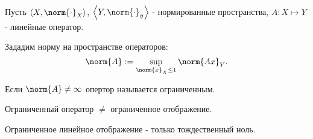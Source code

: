 
\begin{definition} \thmslashn 

    Пусть $\left<X, \norm{\cdot }_{X}\right>$, $\left<Y, \norm{\cdot }_{y}\right>$ - нормированные пространства, $A : X \mapsto Y$ - линейные оператор.

    Зададим норму на пространстве операторов: 
    \[ \norm{A} := \sup\limits_{\norm{x}_{X} \le 1} \norm{Ax}_{Y}  .\] 
\end{definition}
\begin{definition} \thmslashn 

    Если $\norm{A} \neq \infty$ опертор называется ограниченным.
\end{definition}
\begin{remark} \thmslashn

    Ограниченный оператор $\neq $ ограниченное отображение.

    Ограниченное линейное отображение - только тождественный ноль.
\end{remark}

